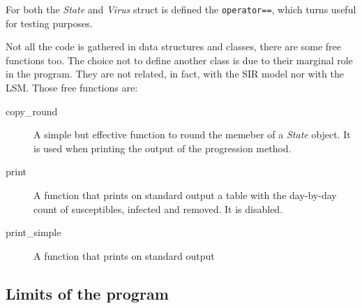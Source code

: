 For both the \emph{State} and \emph{Virus} struct is defined the \verb!operator==!, which turns useful for 
testing purposes.

Not all the code is gathered in data structures and classes, there are some free functions too. The choice not 
to define another class is due to their marginal role in the program. They are not related, in fact, with the 
SIR model nor with the LSM. Those free functions are:
\begin{description}
\item[copy\_round] A simple but effective function to round the memeber of a \emph{State} object. It is used 
when printing the output of the progression method.
\item[print] A function that prints on standard output a table with the day-by-day count of susceptibles, 
infected and removed. It is disabled.
\item[print\_simple] A function that prints on standard output
\end{description}

\subsection{Limits of the program}

